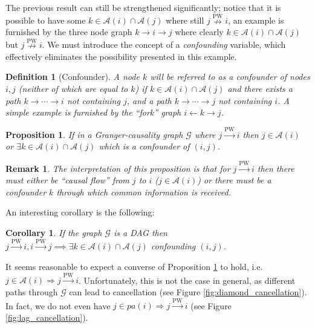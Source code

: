 \documentclass{statsoc}
\def\pwgc{\overset{\text{PW}}{\rightarrow}}  %
\def\npwgc{\overset{\text{PW}}{\nrightarrow}}  %
\def\gcg{\mathcal{G}}  %
\newcommand{\pa}[1]{pa(#1)}  %
\newcommand{\anc}[1]{\mathcal{A}(#1)}  %
\newcommand{\gcgpath}[2]{#1 \rightarrow \cdots \rightarrow #2}  %
\newtheorem{corollary}{Corollary}
\newtheorem{proposition}{Proposition}
\newtheorem{remark}{Remark}
\newtheorem{definition}{Definition}
\begin{document}
The previous result can still be strengthened significantly; notice
that it is possible to have some $k \in \anc{i} \cap \anc{j}$ where still
$j \npwgc i$, an example is furnished by the three node graph
$k \rightarrow i \rightarrow j$ where clearly
$k \in \anc{i}\cap\anc{j}$ but $j \npwgc i$.  We must introduce the concept
of a \textit{confounding} variable, which effectively eliminates the
possibility presented in this example.

\begin{definition}[Confounder]
  A node $k$ will be referred to as a \textit{confounder} of nodes
  $i, j$ (neither of which are equal to $k$) if
  $k \in \anc{i} \cap \anc{j}$ and there exists a path
  $\gcgpath{k}{i}$ not containing $j$, and a path $\gcgpath{k}{j}$ not
  containing $i$. A simple example is furnished by the ``fork'' graph
  $i \leftarrow k \rightarrow j$.
\end{definition}

\begin{proposition}
  \label{prop:ancestor_properties}
  If in a Granger-causality graph $\gcg$ where $j \pwgc i$ then
  $j \in \anc{i}$ or $\exists k \in \anc{i} \cap\anc{j}$ which is a
  confounder of $(i, j)$.
\end{proposition}

\begin{remark}
  The interpretation of this proposition is that for $j \pwgc i$ then
  there must either be ``causal flow'' from $j$ to $i$
  ($j \in \anc{i}$) or there must be a confounder $k$ through which
  common information is received.
\end{remark}

An interesting corollary is the following:

\begin{corollary}
  If the graph $\gcg$ is a DAG then $j \pwgc i, i \pwgc j \implies \exists k \in \anc{i} \cap \anc{j}$ confounding $(i, j)$.
\end{corollary}

It seems reasonable to expect a converse of Proposition
\ref{prop:ancestor_properties} to hold, i.e.
$j \in \anc{i} \Rightarrow j \pwgc i$.  Unfortunately, this is not the
case in general, as different paths through $\gcg$ can lead to
cancellation (see Figure \ref{fig:diamond_cancellation}).  In fact, we
do not even have $j \in \pa{i} \Rightarrow j \pwgc i$ (see Figure
\ref{fig:lag_cancellation}).
\end{document}
